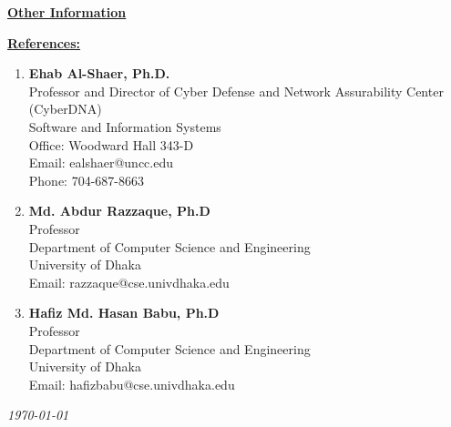 \documentclass[12pt]{article}
\begin{document}
	\vspace{2pt}
	\vspace{2pt}
	\begin{center}\textrm{\textbf{\large{\underline{Other Information}}}}\end{center}
	\vspace{2pt}
    \vspace{2pt}
	\begin{center}\textrm{\textbf{\large{\underline{References: }}}}\end{center}
    \begin{enumerate}
    	\item \textbf{Ehab Al-Shaer, Ph.D.}\\Professor and Director of Cyber Defense and Network Assurability Center (CyberDNA)\\Software and Information Systems\\Office: Woodward Hall 343-D\\Email: ealshaer@uncc.edu\\Phone: 704-687-8663
        \item \textbf{Md. Abdur Razzaque, Ph.D}\\Professor\\Department of Computer Science and Engineering\\University of Dhaka\\Email: razzaque@cse.univdhaka.edu
        \item \textbf{Hafiz Md. Hasan Babu, Ph.D}\\Professor\\Department of Computer Science and Engineering\\University of Dhaka\\Email: hafizbabu@cse.univdhaka.edu
    \end{enumerate}
    \em{\today}
\end{document}
